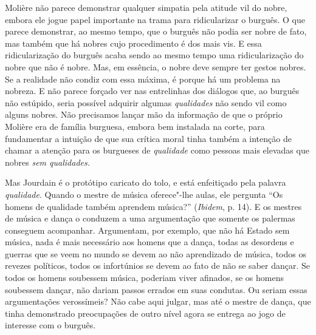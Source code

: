 Molière não parece demonstrar qualquer simpatia pela atitude vil do
nobre, embora ele jogue papel importante na trama para ridicularizar o
burguês. O que parece demonstrar, ao mesmo tempo, que o burguês não
podia ser nobre de fato, mas também que há nobres cujo procedimento é
dos mais vis. E essa ridicularização do burguês acaba sendo ao mesmo
tempo uma ridicularização do nobre que não é nobre. Mas, em essência, o
nobre deve sempre ter gestos nobres. Se a realidade não condiz com essa
máxima, é porque há um problema na nobreza. E não parece forçado ver nas
entrelinhas dos diálogos que, ao burguês não estúpido, seria possível
adquirir algumas \emph{qualidades} não sendo vil como alguns nobres. Não
precisamos lançar mão da informação de que o próprio Molière era de
família burguesa, embora bem instalada na corte, para fundamentar a
intuição de que sua crítica moral tinha também a intenção de chamar a
atenção para os burgueses de \emph{qualidade} como pessoas mais elevadas
que nobres \emph{sem qualidades.}

Mas Jourdain é o protótipo caricato do tolo, e está enfeitiçado pela
palavra \emph{qualidade}. Quando o mestre de música oferece"-lhe aulas,
ele pergunta ``Os homens de qualidade também aprendem música?''
(\emph{Ibidem}, p. 14). E os mestres de música e dança o conduzem a uma
argumentação que somente os palermas conseguem acompanhar. Argumentam,
por exemplo, que não há Estado sem música, nada é mais necessário aos
homens que a dança, todas as desordens e guerras que se veem no mundo se
devem ao não aprendizado de música, todos os revezes políticos, todos os
infortúnios se devem ao fato de não se saber dançar. Se todos os homens
soubessem música, poderiam viver afinados, se os homens soubessem
dançar, não dariam passos errados em suas condutas. Ou seriam essas
argumentações verossímeis? Não cabe aqui julgar, mas até o mestre de
dança, que tinha demonstrado preocupações de outro nível agora se
entrega ao jogo de interesse com o burguês.

